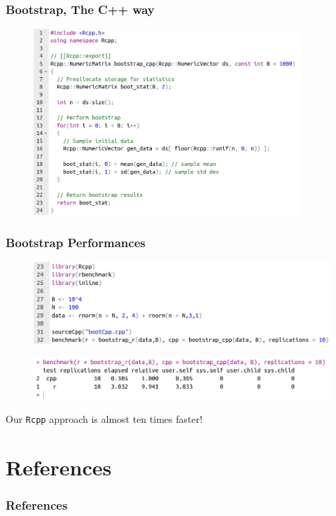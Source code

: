 \documentclass{beamer}
\def\code#1{\texttt{#1}} %
\begin{document}
\begin{frame}
\frametitle{Bootstrap, The C++ way}

\begin{figure}[b2]
    \includegraphics[width=0.9\textwidth]{bootstrap_cpp.png}
\end{figure}

\end{frame}


\begin{frame}
\frametitle{Bootstrap Performances}

\begin{figure}[b3]
    \includegraphics[width=1 \textwidth]{bootstrap_call.png}
\end{figure}

\begin{figure}[b4]
    \includegraphics[width=1 \textwidth]{bootstrap_r_vs_cpp.png}
\end{figure}

Our \code{Rcpp} approach is almost ten times faster!

\end{frame}


\section{References}

\begin{frame}[allowframebreaks]
\frametitle{References}
    
    
    \nocite{*}
\end{frame}
\end{document}
